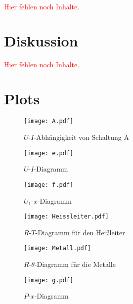\documentclass[11pt, ngerman]{article}
\newcommand{\fehlt}{\textcolor{red}{Hier fehlen noch Inhalte.}}
\begin{document}
\fehlt


\section{Diskussion}

\fehlt



\newpage

\section{Plots}

\begin{figure}[h!]
	\centering
	\texttt{[image: A.pdf]}
	\caption{$U$-$I$-Abhängigkeit von Schaltung A}
	\label{fig:A}
\end{figure}

\begin{figure}[h!]
	\centering
	\texttt{[image: e.pdf]}
	\caption{$U$-$I$-Diagramm}
	\label{fig:e}
\end{figure}

\begin{figure}[h!]
	\centering
	\texttt{[image: f.pdf]}
	\caption{$U_1$-$x$-Diagramm}
	\label{fig:f}
\end{figure}

\begin{figure}[h!]
	\centering
	\texttt{[image: Heissleiter.pdf]}
	\caption{$R$-$T$-Diagramm für den Heißleiter}
	\label{fig:rt}
\end{figure}

\begin{figure}[h!]
	\centering
	\texttt{[image: Metall.pdf]}
	\caption{$R$-$\theta$-Diagramm für die Metalle}
	\label{fig:metall}
\end{figure}

\begin{figure}[h!]
	\centering
	\texttt{[image: g.pdf]}
	\caption{$P$-$x$-Diagramm}
	\label{fig:g}
\end{figure}
\end{document}
